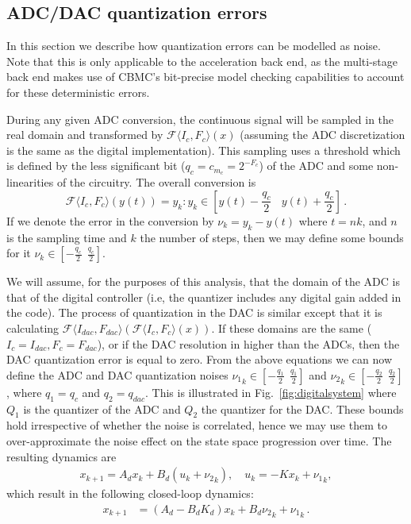 \documentclass[twocolumn]{autart}    %
\begin{document}
\subsection{ADC/DAC quantization errors} 
In this section we describe how quantization errors can be modelled as noise. Note that this is only applicable to the acceleration back end, as the multi-stage back end makes use of CBMC's bit-precise model checking capabilities to account for these deterministic errors.

During any given ADC conversion, the continuous signal will be sampled in
the real domain and transformed by $\mathcal{F}\langle I_{c},F_{c} \rangle
(x)$ (assuming the ADC discretization is the same as the digital
implementation).  This sampling uses a threshold which is defined by the
less significant bit ($q_{c}=c_{m_c}=2^{-F_c}$) 
of the ADC and some non-linearities of the circuitry.  The overall conversion is
%
$$\mathcal{F}\langle I_{c},F_{c} \rangle(y(t)) = y_k :
y_k \in \left[y(t)-\frac{q_{c}}{2}\ \ \ \ y(t)+\frac{q_{c}}{2}\right] \,.$$
%
If we denote the error in the conversion by $\nu_k=y_k-y(t)$ where $t = nk$,
and $n$ is the sampling time and $k$ the number of steps, then we may define
some bounds for it $\nu_k \in [-\frac{q_{c}}{2}\ \ \frac{q_{c}}{2}]$.

We will assume, for the purposes of this analysis, that the domain of the
ADC is that of the digital controller (i.e, the quantizer includes any
digital gain added in the code).  The process of quantization in the DAC is
similar except that it is calculating $\mathcal{F}\langle I_{dac},F_{dac}
\rangle (\mathcal{F}\langle I_{c},F_{c} \rangle (x)) $.  If these domains
are the same ($I_{c}=I_{dac},\allowbreak F_{c}=F_{dac}$), or if the DAC
resolution in higher than the ADCs, then the DAC quantization error is equal
to zero.  From the above equations we can now define the ADC and DAC
quantization noises ${\nu_1}_k \in [-\frac{q_1}{2}\ \ \frac{q_1}{2}]$ and
${\nu_2}_k \in [-\frac{q_2}{2}\ \ \frac{q_2}{2}]$, where $q_1=q_{c}$ and 
$q_2=q_\mathit{dac}$.  This is illustrated in
Fig.~\ref{fig:digitalsystem} where $Q_1$ is the quantizer of the ADC
and $Q_2$ the quantizer for the DAC.  These bounds hold irrespective of
whether the noise is correlated, hence we may use them to over-approximate
the noise effect on the state space progression over time.  The
resulting dynamics are
%
\begin{align*}
{x}_{k+1} = {A}_d{x}_k+{B}_d({u}_k+{{\nu}_2}_k), \quad u_k = -K{x}_{k}+{{\nu}_1}_k, 
\end{align*}
%
which result in the following closed-loop dynamics:
%
\begin{align*}
{x}_{k+1} &= ({A}_d-{B}_d{K}_d) {x}_k+{B}_d{{\nu}_2}_k +{{\nu}_1}_k \,. 
\end{align*}
\end{document}
